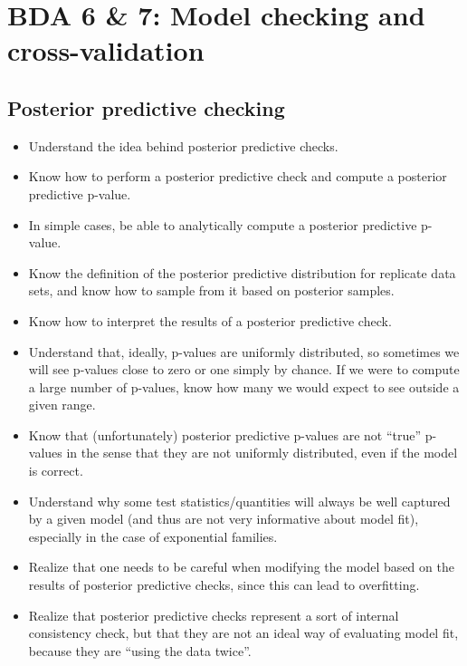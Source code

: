 \documentclass[12pt]{article}
\begin{document}
\section{BDA 6 \& 7: Model checking and cross-validation}

\subsection{Posterior predictive checking}
\begin{itemize}
\item Understand the idea behind posterior predictive checks.
\item Know how to perform a posterior predictive check and compute a posterior predictive p-value.
\item In simple cases, be able to analytically compute a posterior predictive p-value.
\item Know the definition of the posterior predictive distribution for replicate data sets, and know how to sample from it based on posterior samples.
\item Know how to interpret the results of a posterior predictive check. 
\item Understand that, ideally, p-values are uniformly distributed, so sometimes we will see p-values close to zero or one simply by chance. If we were to compute a large number of p-values, know how many we would expect to see outside a given range.
\item Know that (unfortunately) posterior predictive p-values are not ``true'' p-values in the sense that they are not uniformly distributed, even if the model is correct.
\item Understand why some test statistics/quantities will always be well captured by a given model (and thus are not very informative about model fit), especially in the case of exponential families.
\item Realize that one needs to be careful when modifying the model based on the results of posterior predictive checks, since this can lead to overfitting.
\item Realize that posterior predictive checks represent a sort of internal consistency check, but that they are not an ideal way of evaluating model fit, because they are ``using the data twice''.
\end{itemize}
\end{document}
